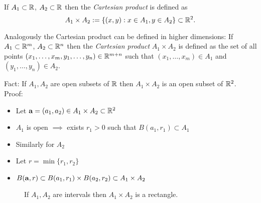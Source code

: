 \begin{definition}
    If \(A_1 \subset \bR\), \(A_2 \subset \bR\) then the \emph{Cartesian product} is defined as
    \[
        A_1 \times A_2 := \left\{(x,y): x \in A_1, y \in A_2\right\}
        \subset \bR^{2}.
    \]
\end{definition}

Analogously the Cartesian product can be defined in higher dimensions:
If \(A_1 \subset \bR^m\), \(A_2 \subset \bR^n\) then the \emph{Cartesian product} \(A_1 \times A_2\) is defined as the set of all points \((x_1,\ldots,x_m,y_1,\ldots,y_n) \in \bR^{m+n}\) such that \((x_1,\ldots,x_m) \in A_1\) and \((y_1,\ldots,y_n) \in A_2\).

    {Fact:}
If \(A_1, A_2\) are open subsets of \(\bR\) then \( A_1 \times A_2 \) is an open subset of \(\bR^2\).
Proof:
\begin{itemize}
    \item     Let \(\aa = (a_1,a_2) \in A_1\times A_2 \subset \bR^2\)
    \item     \(A_1\) is open \(\implies\)  exists \(r_1>0\) such that \(B(a_1,r_1)\subset A_1\)
    \item Similarly for \(A_2\)
    \item Let \(r=\min \{r_1,r_2\}\)
    \item \(B(\aa,r) \subset B(a_1,r_1) \times B(a_2,r_2) \subset A_1\times A_2\)
\end{itemize}



\begin{figure}[htb]
    \begin{centering}
        \caption{If \(A_1, A_2\) are intervals then \( A_1 \times A_2 \) is a rectangle.}
    \end{centering}
\end{figure}

